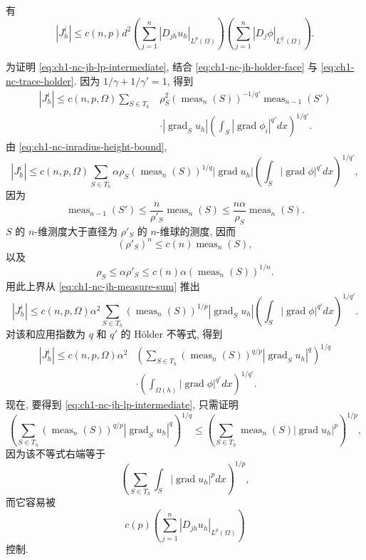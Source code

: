 \begin{Lemma}
\label{lem:ch1-nc-jh-lp-intermediate}
有
\begin{equation}
|J_h^i|\leq c(n,p)d^2
\left(\sum_{j=1}^n|D_{jh}u_h|_{L^p(\Omega)}\right)
\left(\sum_{j=1}^n|D_j\phi|_{L^{q'}(\Omega)}\right).
\label{eq:ch1-nc-jh-lp-intermediate}
\end{equation}
\end{Lemma}

\begin{Proof}
为证明 \eqref{eq:ch1-nc-jh-lp-intermediate}, 结合 \eqref{eq:ch1-nc-jh-holder-face} 与 \eqref{eq:ch1-nc-trace-holder}. 因为 $1/\gamma+1/\gamma'=1$, 得到
\[
\begin{aligned}
|J_h^i|\leq c(n,p,\Omega)\sum_{S\in T_h}
&\rho_S^2(\operatorname{meas}_n(S))^{-1/q'}
\operatorname{meas}_{n-1}(S')\\
&\cdot|\operatorname{grad}_S u_h|
\left(\int_S|\operatorname{grad}\phi_i|^{q'}dx\right)^{1/q'}.
\end{aligned}
\]
由 \eqref{eq:ch1-nc-inradius-height-bound},
\begin{equation}
|J_h^i|\leq c(n,p,\Omega)
\sum_{S\in T_h}\alpha\rho_S
(\operatorname{meas}_n(S))^{1/q}
|\operatorname{grad}u_h|
\left(\int_S|\operatorname{grad}\phi|^{q'}dx\right)^{1/q'},
\label{eq:ch1-nc-jh-measure-sum}
\end{equation}
因为
\[
\operatorname{meas}_{n-1}(S')
\leq\frac n{\rho'_S}\operatorname{meas}_n(S)
\leq\frac{n\alpha}{\rho_S}\operatorname{meas}_n(S).
\]
$S$ 的 $n$-维测度大于直径为 $\rho'_S$ 的 $n$-维球的测度, 因而
\[
(\rho'_S)^n\leq c(n)\operatorname{meas}_n(S),
\]
以及
\[
\rho_S\leq\alpha\rho'_S
\leq c(n)\alpha(\operatorname{meas}_n(S))^{1/n}.
\]
用此上界从 \eqref{eq:ch1-nc-jh-measure-sum} 推出
\[
|J_h^i|\leq c(n,p,\Omega)\alpha^2\sum_{S\in T_h}
(\operatorname{meas}_n(S))^{1/p}|\operatorname{grad}_S u_h|
\left(\int_S|\operatorname{grad}\phi|^{q'}dx\right)^{1/q'}.
\]
对该和应用指数为 $q$ 和 $q'$ 的 Hölder 不等式, 得到
\begin{equation}
\begin{aligned}
|J_h^i|\leq c(n,p,\Omega)\alpha^2
&\left(\sum_{S\in T_h}(\operatorname{meas}_n(S))^{q/p}
|\operatorname{grad}_S u_h|^q\right)^{1/q}\\
&\cdot\left(\int_{\Omega(h)}|\operatorname{grad}\phi|^{q'}dx\right)^{1/q'}.
\end{aligned}
\label{eq:ch1-nc-jh-global-holder}
\end{equation}
现在, 要得到 \eqref{eq:ch1-nc-jh-lp-intermediate}, 只需证明
\begin{equation}
\left(\sum_{S\in T_h}(\operatorname{meas}_n(S))^{q/p}
|\operatorname{grad}_S u_h|^q\right)^{1/q}
\leq
\left(\sum_{S\in T_h}\operatorname{meas}_n(S)
|\operatorname{grad}u_h|^p\right)^{1/p},
\label{eq:ch1-nc-discrete-lp-lq}
\end{equation}
因为该不等式右端等于
\[
\left(\sum_{S\in T_h}\int_S|\operatorname{grad}u_h|^pdx\right)^{1/p},
\]
而它容易被
\[
c(p)\left(\sum_{j=1}^n|D_{jh}u_h|_{L^p(\Omega)}\right)
\]
控制.
\end{Proof}

